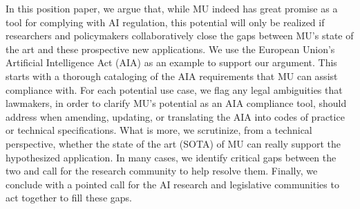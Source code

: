 In this position paper, we argue that, while MU indeed has great promise as a tool for complying with AI regulation, this potential will only be realized if researchers and policymakers collaboratively close the gaps between MU's state of the art and these prospective new applications. We use the European Union's Artificial Intelligence Act (AIA) \citep{european_union_ai_act_2024} as an example to support our argument. 
This starts with a thorough cataloging of the AIA requirements that MU can assist compliance with.
For each potential use case, we flag any legal ambiguities that lawmakers, in order to clarify MU's potential as an AIA compliance tool, should address when amending, updating, or translating the AIA into codes of practice or technical specifications. What is more, we scrutinize, from a technical perspective, whether the state of the art (SOTA) of MU can really support the hypothesized application. In many cases, we identify critical gaps between the two and call for the research community to help resolve them. Finally, we conclude with a pointed call for the AI research and legislative communities to act together to fill these gaps.






